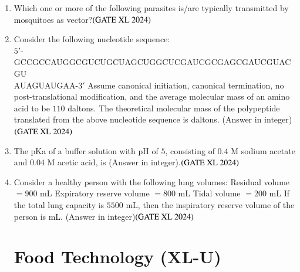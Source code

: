 \documentclass[journal]{IEEEtran}
\begin{document}
\begin{enumerate}
    \item Which one or more of the following parasites is/are typically transmitted by mosquitoes as vector?\hfill $\left(\text{GATE XL 2024}\right)$
    \begin{enumerate}
    \end{enumerate}

    \item Consider the following nucleotide sequence:  \\
    $5'$-GCCGCCAUGGCGUCUGCUAGCUGGCUCGAUCGCGAGCGAUCGUACGU\\AUAGUAUGAA-$3'$  
    Assume canonical initiation, canonical termination, no post-translational modification, and the average molecular mass of an amino acid to be $110$ daltons.  
    The theoretical molecular mass of the polypeptide translated from the above nucleotide sequence is daltons. (Answer in integer)\hfill $\left(\text{GATE XL 2024}\right)$

    \item The pKa of a buffer solution with pH of $5$, consisting of $0.4$ M sodium acetate and $0.04$ M acetic acid, is (Answer in integer).\hfill $\left(\text{GATE XL 2024}\right)$

    \item Consider a healthy person with the following lung volumes:  
    Residual volume $= 900$ mL  
    Expiratory reserve volume $= 800$ mL  
    Tidal volume $= 200$ mL  
    If the total lung capacity is $5500$ mL, then the inspiratory reserve volume of the person is mL. (Answer in integer)\hfill $\left(\text{GATE XL 2024}\right)$

\maketitle
\section*{Food Technology (XL-U)}

\end{enumerate}
\end{document}
